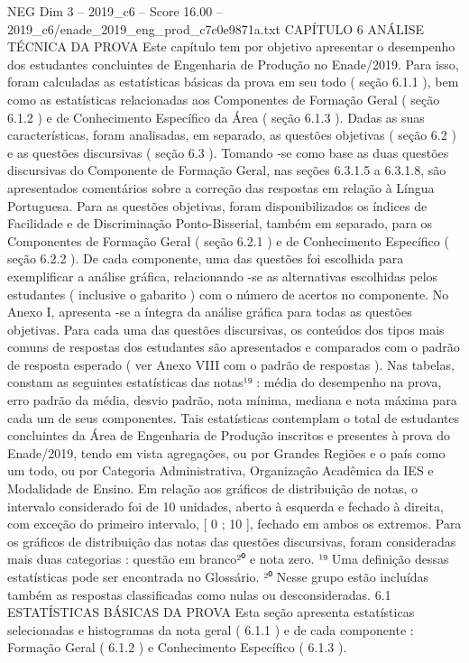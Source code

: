 \begin{textsample}{NEG Dim 3 – 2019\_c6 – Score 16.00 – 2019\_c6/enade\_2019\_eng\_prod\_c7c0e9871a.txt}  \label{ex:f3_neg_273}
CAPÍTULO 6 ANÁLISE TÉCNICA DA PROVA Este capítulo tem por objetivo apresentar o desempenho dos estudantes concluintes de Engenharia de Produção no Enade/2019.
Para isso, foram calculadas as estatísticas básicas da prova em seu todo ( seção 6.1.1 ), bem como as estatísticas relacionadas aos Componentes de Formação Geral ( seção 6.1.2 ) e de Conhecimento Específico da Área ( seção 6.1.3 ).
Dadas as suas características, foram analisadas, em separado, as questões objetivas ( seção 6.2 ) e as questões discursivas ( seção 6.3 ).
Tomando -se como base as duas questões discursivas do Componente de Formação Geral, nas seções 6.3.1.5 a 6.3.1.8, são apresentados comentários sobre a correção das respostas em relação à Língua Portuguesa.
Para as questões objetivas, foram disponibilizados os índices de Facilidade e de Discriminação Ponto-Bisserial, também em separado, para os Componentes de Formação Geral ( seção 6.2.1 ) e de Conhecimento Específico ( seção 6.2.2 ).
De cada componente, uma das questões foi escolhida para exemplificar a análise gráfica, relacionando -se as alternativas escolhidas pelos estudantes ( inclusive o gabarito ) com o número de acertos no componente.
No Anexo I, apresenta -se a íntegra da análise gráfica para todas as questões objetivas.
Para cada uma das questões discursivas, os conteúdos dos tipos mais comuns de respostas dos estudantes são apresentados e comparados com o padrão de resposta esperado ( ver Anexo VIII com o padrão de respostas ).
Nas tabelas, constam as seguintes estatísticas das notas¹⁹ : média do desempenho na prova, erro padrão da média, desvio padrão, nota mínima, mediana e nota máxima para cada um de seus componentes.
Tais estatísticas contemplam o total de estudantes concluintes da Área de Engenharia de Produção inscritos e presentes à prova do Enade/2019, tendo em vista agregações, ou por Grandes Regiões e o país como um todo, ou por Categoria Administrativa, Organização Acadêmica da IES e Modalidade de Ensino.
Em relação aos gráficos de distribuição de notas, o intervalo considerado foi de 10 unidades, aberto à esquerda e fechado à direita, com exceção do primeiro intervalo, [ 0 ; 10 ], fechado em ambos os extremos.
Para os gráficos de distribuição das notas das questões discursivas, foram consideradas mais duas categorias : questão em branco²⁰ e nota zero. ¹⁹ Uma definição dessas estatísticas pode ser encontrada no Glossário. ²⁰ Nesse grupo estão incluídas também as respostas classificadas como nulas ou desconsideradas. 6.1 ESTATÍSTICAS BÁSICAS DA PROVA Esta seção apresenta estatísticas selecionadas e histogramas da nota geral ( 6.1.1 ) e de cada componente : Formação Geral ( 6.1.2 ) e Conhecimento Específico ( 6.1.3 ).

\end{textsample}

